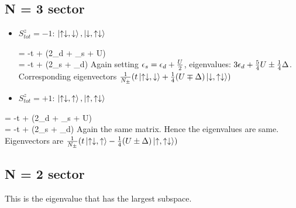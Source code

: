 \documentclass[12pt]{article}
\begin{document}
\subsection{N = 3 sector}
\begin{itemize}
\item \(S_{tot}^z = -1\): \(\ket{\uparrow\downarrow,\downarrow}, \ket{\downarrow,\uparrow\downarrow}\)

\beq
\ham \ket{\uparrow\downarrow,\downarrow} = -t\ket{\downarrow,\uparrow\downarrow} + (2\epsilon_d + \epsilon_s + U)\ket{\uparrow\downarrow,\downarrow} \\
\ham \ket{\downarrow,\uparrow\downarrow} = -t\ket{\uparrow\downarrow,\downarrow} + (2\epsilon_s + \epsilon_d)\ket{\downarrow,\uparrow\downarrow}
\eeq
\beq
{}
\eeq
Again setting \(\epsilon_s = \epsilon_d + \frac{U}{2}\), eigenvalues: \(3\epsilon_d + \frac{5}{4}U \pm \frac{1}{4}\Delta\). \\ Corresponding eigenvectors \(\frac{1}{N_\pm}(t\ket{\uparrow\downarrow,\downarrow}+\frac{1}{4}(U\mp\Delta)\ket{\downarrow,\uparrow\downarrow})\)

\item \(S_{tot}^z = +1\): \(\ket{\uparrow\downarrow,\uparrow}, \ket{\uparrow,\uparrow\downarrow}\)
\end{itemize}

\beq
\ham \ket{\uparrow\downarrow,\uparrow} = -t\ket{\uparrow,\uparrow\downarrow} + (2\epsilon_d + \epsilon_s + U)\ket{\uparrow\downarrow,\uparrow} \\
\ham \ket{\uparrow,\uparrow\downarrow} = -t\ket{\uparrow\downarrow,\uparrow} + (2\epsilon_s + \epsilon_d)\ket{\uparrow,\uparrow\downarrow}
\eeq
Again the same matrix. Hence the eigenvalues are same. Eigenvectors are
\(\frac{1}{N_\pm}(t\ket{\uparrow\downarrow,\uparrow}-\frac{1}{4}(U\pm\Delta)\ket{\uparrow,\uparrow\downarrow})\)

\subsection{N = 2 sector}

This is the eigenvalue that has the largest subspace.
\end{document}
